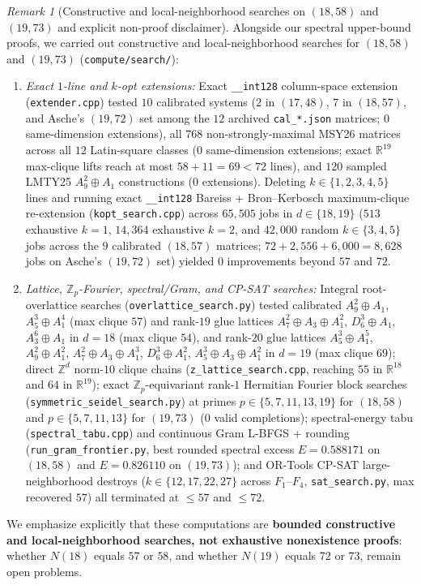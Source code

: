 \documentclass[11pt,reqno]{amsart}
\theoremstyle{definition}
\theoremstyle{remark}
\newtheorem{remark}[theorem]{Remark}
\numberwithin{equation}{section}
\numberwithin{table}{section}
\begin{document}
\begin{remark}[Constructive and local-neighborhood searches on $(18, 58)$ and $(19, 73)$ and explicit non-proof disclaimer]\label{rem:trackb_disclaimer}
Alongside our spectral upper-bound proofs, we carried out constructive and local-neighborhood searches for $(18, 58)$ and $(19, 73)$ (\nolinkurl{compute/search/}):
\begin{enumerate}
  \item \emph{Exact $1$-line and $k$-opt extensions:} Exact \texttt{\_\_int128} column-space extension (\nolinkurl{extender.cpp}) tested $10$ calibrated systems ($2$ in $(17,48)$, $7$ in $(18,57)$, and Asche's $(19,72)$ set among the $12$ archived \nolinkurl{cal_*.json} matrices; $0$ same-dimension extensions), all $768$ non-strongly-maximal MSY26 matrices across all $12$ Latin-square classes ($0$ same-dimension extensions; exact $\mathbb{R}^{19}$ max-clique lifts reach at most $58 + 11 = 69 < 72$ lines), and $120$ sampled LMTY25 $A_9^2 \oplus A_1$ constructions ($0$ extensions). Deleting $k \in \{1, 2, 3, 4, 5\}$ lines and running exact \texttt{\_\_int128} Bareiss + Bron--Kerbosch maximum-clique re-extension (\nolinkurl{kopt_search.cpp}) across $65{,}505$ jobs in $d \in \{18, 19\}$ ($513$ exhaustive $k=1$, $14{,}364$ exhaustive $k=2$, and $42{,}000$ random $k \in \{3,4,5\}$ jobs across the $9$ calibrated $(18,57)$ matrices; $72 + 2{,}556 + 6{,}000 = 8{,}628$ jobs on Asche's $(19,72)$ set) yielded $0$ improvements beyond $57$ and $72$.
  \item \emph{Lattice, $\mathbb{Z}_p$-Fourier, spectral/Gram, and CP-SAT searches:} Integral root-overlattice searches (\nolinkurl{overlattice_search.py}) tested calibrated $A_9^2 \oplus A_1$, $A_5^3 \oplus A_1^4$ (max clique $57$) and rank-$19$ glue lattices $A_7^2 \oplus A_3 \oplus A_1^2$, $D_6^3 \oplus A_1$, $A_3^6 \oplus A_1$ in $d = 18$ (max clique $54$), and rank-$20$ glue lattices $A_5^3 \oplus A_1^5$, $A_9^2 \oplus A_1^2$, $A_7^2 \oplus A_3 \oplus A_1^3$, $D_6^3 \oplus A_1^2$, $A_5^3 \oplus A_3 \oplus A_1^2$ in $d = 19$ (max clique $69$); direct $\mathbb{Z}^d$ norm-$10$ clique chains (\nolinkurl{z_lattice_search.cpp}, reaching $55$ in $\mathbb{R}^{18}$ and $64$ in $\mathbb{R}^{19}$); exact $\mathbb{Z}_p$-equivariant rank-$1$ Hermitian Fourier block searches (\nolinkurl{symmetric_seidel_search.py}) at primes $p \in \{5, 7, 11, 13, 19\}$ for $(18,58)$ and $p \in \{5, 7, 11, 13\}$ for $(19,73)$ ($0$ valid completions); spectral-energy tabu (\nolinkurl{spectral_tabu.cpp}) and continuous Gram L-BFGS + rounding (\nolinkurl{run_gram_frontier.py}, best rounded spectral excess $E = 0.588171$ on $(18,58)$ and $E = 0.826110$ on $(19,73)$); and OR-Tools CP-SAT large-neighborhood destroys ($k \in \{12, 17, 22, 27\}$ across $F_1$--$F_4$, \nolinkurl{sat_search.py}, max recovered $57$) all terminated at $\le 57$ and $\le 72$.
\end{enumerate}
We emphasize explicitly that these computations are \textbf{bounded constructive and local-neighborhood searches, not exhaustive nonexistence proofs}: whether $N(18)$ equals $57$ or $58$, and whether $N(19)$ equals $72$ or $73$, remain open problems.
\end{remark}
\end{document}
